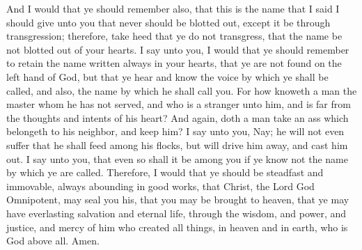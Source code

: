 \bverse \iffalse And I would that ye should remember also, that this is the name that I said I should give unto you that never should be blotted out, except it be through transgression; therefore, take heed that ye do not transgress, that the name be not blotted out of your hearts. \fi
And I would that ye should remember also, that this is the name that I said I should give unto you that never should be blotted out, except it be through transgression; therefore, take heed that ye do not transgress, that the name be not blotted out of your hearts.
\bverse \iffalse I say unto you, I would that ye should remember to retain the name written always in your hearts, that ye are not found on the left hand of God, but that ye hear and know the voice by which ye shall be called, and also, the name by which he shall call you. \fi
I say unto you, I would that ye should remember to retain the name written always in your hearts, that ye are not found on the left hand of God, but that ye hear and know the voice by which ye shall be called, and also, the name by which he shall call you.
\bverse \iffalse For how knoweth a man the master whom he has not served, and who is a stranger unto him, and is far from the thoughts and intents of his heart? \fi
For how knoweth a man the master whom he has not served, and who is a stranger unto him, and is far from the thoughts and intents of his heart?
\bverse \iffalse And again, doth a man take an ass which belongeth to his neighbor, and keep him? I say unto you, Nay; he will not even suffer that he shall feed among his flocks, but will drive him away, and cast him out. I say unto you, that even so shall it be among you if ye know not the name by which ye are called. \fi
And again, doth a man take an ass which belongeth to his neighbor, and keep him? I say unto you, Nay; he will not even suffer that he shall feed among his flocks, but will drive him away, and cast him out. I say unto you, that even so shall it be among you if ye know not the name by which ye are called.
\bverse \iffalse Therefore, I would that ye should be steadfast and immovable, always abounding in good works, that Christ, the Lord God Omnipotent, may seal you his, that you may be brought to heaven, that ye may have everlasting salvation and eternal life, through the wisdom, and power, and justice, and mercy of him who created all things, in heaven and in earth, who is God above all. Amen. \fi
Therefore, I would that ye should be steadfast and immovable, always abounding in good works, that Christ, the Lord God Omnipotent, may seal you his, that you may be brought to heaven, that ye may have everlasting salvation and eternal life, through the wisdom, and power, and justice, and mercy of him who created all things, in heaven and in earth, who is God above all. Amen.

